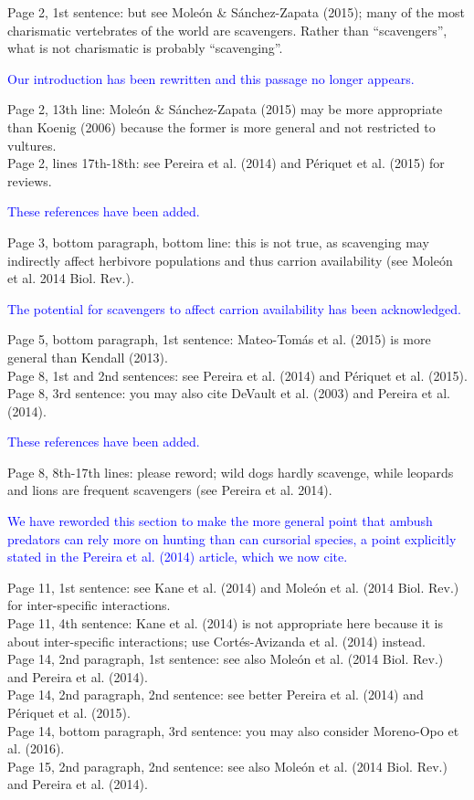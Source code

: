 \documentclass[12pt,letterpaper]{article}
\begin{document}
\begin{enumerate}
Page 2, 1st sentence: but see Mole\'{o}n \& S\'{a}nchez-Zapata (2015); many of the most charismatic vertebrates of the world are scavengers. Rather than ``scavengers'', what is not charismatic is probably ``scavenging''.

\textcolor{blue}{Our introduction has been rewritten and this passage no longer appears.}

 Page 2, 13th line: Mole\'{o}n \& S\'{a}nchez-Zapata (2015) may be more appropriate than Koenig (2006) because the former is more general and not restricted to vultures.\\
 Page 2, lines 17th-18th: see Pereira et al. (2014) and P\'{e}riquet et al. (2015) for reviews.

\textcolor{blue}{These references have been added.}

 Page 3, bottom paragraph, bottom line: this is not true, as scavenging may indirectly affect herbivore populations and thus carrion availability (see Mole\'{o}n et al. 2014 Biol. Rev.).

\textcolor{blue}{The potential for scavengers to affect carrion availability has been acknowledged.}

 Page 5, bottom paragraph, 1st sentence: Mateo-Tom\'{a}s et al. (2015) is more general than Kendall (2013).\\
 Page 8, 1st and 2nd sentences: see Pereira et al. (2014) and P\'{e}riquet et al. (2015).\\
 Page 8, 3rd sentence: you may also cite DeVault et al. (2003) and Pereira et al. (2014).

\textcolor{blue}{These references have been added.}

 Page 8, 8th-17th lines: please reword; wild dogs hardly scavenge, while leopards and lions are frequent scavengers (see Pereira et al. 2014).

\textcolor{blue}{We have reworded this section to make the more general point that ambush predators can rely more on hunting than can cursorial species, a point explicitly stated in the Pereira et al. (2014) article, which we now cite.}

 Page 11, 1st sentence: see Kane et al. (2014) and Mole\'{o}n et al. (2014 Biol. Rev.) for inter-specific interactions.\\
 Page 11, 4th sentence: Kane et al. (2014) is not appropriate here because it is about inter-specific interactions; use Cort\'{e}s-Avizanda et al. (2014) instead.\\
 Page 14, 2nd paragraph, 1st sentence: see also Mole\'{o}n et al. (2014 Biol. Rev.) and Pereira et al. (2014).\\
 Page 14, 2nd paragraph, 2nd sentence: see better Pereira et al. (2014) and P\'{e}riquet et al. (2015). \\
 Page 14, bottom paragraph, 3rd sentence: you may also consider Moreno-Opo et al. (2016).\\
 Page 15, 2nd paragraph, 2nd sentence: see also Mole\'{o}n et al. (2014 Biol. Rev.) and Pereira et al. (2014).


\end{enumerate}
\end{document}
